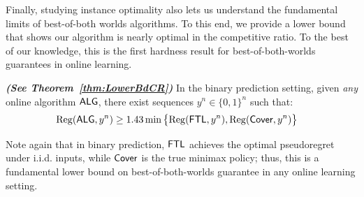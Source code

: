 Finally, studying instance optimality also lets us understand the fundamental limits of best-of-both worlds algorithms.
To this end, we provide a lower bound that shows our algorithm is nearly optimal in the competitive ratio. 
To the best of our knowledge, this is the first hardness result for best-of-both-worlds guarantees in online learning.
\begin{thm}{\emph{\bf (See Theorem~\ref{thm:LowerBdCR})}}
In the binary prediction setting, given \emph{any} online algorithm $\mathsf{ALG}$, there exist sequences $y^n\in\{0,1\}^n$ such that:
\begin{align*}
    \mathrm{Reg}(\mathsf{ALG},y^n)
    &\geq 1.43\min\left\{\mathrm{Reg}(\mathsf{FTL},y^n),\mathrm{Reg}(\mathsf{Cover},y^n)\right\}
\end{align*}
\end{thm}
Note again that in binary prediction, $\mathsf{FTL}$ achieves the optimal pseudoregret under i.i.d. inputs, while $\mathsf{Cover}$ is the true minimax policy; thus, this is a fundamental lower bound on best-of-both-worlds guarantee in any online learning setting.

